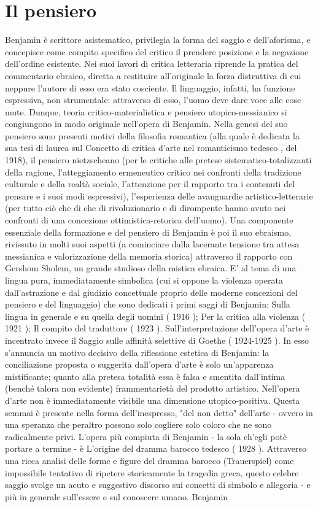 \section{Il pensiero}
Benjamin è scrittore asistematico, privilegia la forma del saggio e dell'aforisma, e concepisce come compito specifico del critico il prendere posizione e la negazione dell'ordine esistente. Nei suoi lavori di critica letteraria riprende la pratica del commentario ebraico, diretta a restituire all'originale la forza distruttiva di cui neppure l'autore di esso era stato cosciente. Il linguaggio, infatti, ha funzione espressiva, non strumentale: attraverso di esso, l'uomo deve dare voce alle cose mute. Dunque, teoria critico-materialistica e pensiero utopico-messianico si congiungono in modo originale nell'opera di Benjamin. Nella genesi del suo pensiero sono presenti motivi della filosofia romantica (alla quale è dedicata la sua tesi di laurea sul Concetto di critica d'arte nel romanticismo tedesco , del 1918), il pensiero nietzscheano (per le critiche alle pretese sistematico-totalizzanti della ragione, l'atteggiamento ermeneutico critico nei confronti della tradizione culturale e della realtà sociale, l'attenzione per il rapporto tra i contenuti del pensare e i suoi modi espressivi), l'esperienza delle avanguardie artistico-letterarie (per tutto ciò che di che di rivoluzionario e di dirompente hanno avuto nei confronti di una concezione ottimistica-retorica dell'uomo). Una componente essenziale della formazione e del pensiero di Benjamin è poi il suo ebraismo, rivissuto in molti suoi aspetti (a cominciare dalla lacerante tensione tra attesa messianica e valorizzazione della memoria storica) attraverso il rapporto con Gershom Sholem, un grande studioso della mistica ebraica. E' al tema di una lingua pura, immediatamente simbolica (cui si oppone la violenza operata dall'astrazione e dal giudizio concettuale proprio delle moderne concezioni del pensiero e del linguaggio) che sono dedicati i primi saggi di Benjamin: Sulla lingua in generale e su quella degli uomini ( 1916 ); Per la critica alla violenza ( 1921 ); Il compito del traduttore ( 1923 ). Sull'interpretazione dell'opera d'arte è incentrato invece il Saggio sulle affinità selettive di Goethe ( 1924-1925 ). In esso s'annuncia un motivo decisivo della riflessione estetica di Benjamin: la conciliazione proposta o suggerita dall'opera d'arte è solo un'apparenza mistificante; quanto alla pretesa totalità essa è falsa e smentita dall'intima (benché talora non evidente) frammentarietà del prodotto artistico. Nell'opera d'arte non è immediatamente visibile una dimensione utopico-positiva. Questa semmai è presente nella forma dell'inespresso, "del non detto" dell'arte - ovvero in una speranza che peraltro possono solo cogliere solo coloro che ne sono radicalmente privi. L'opera più compiuta di Benjamin - la sola ch'egli potè portare a termine - è L'origine del dramma barocco tedesco ( 1928 ). Attraverso una ricca analisi delle forme e figure del dramma barocco (Trauerspiel) come impossibile tentativo di ripetere storicamente la tragedia greca, questo celebre saggio svolge un acuto e suggestivo discorso sui concetti di simbolo e allegoria - e più in generale sull'essere e sul conoscere umano. Benjamin 